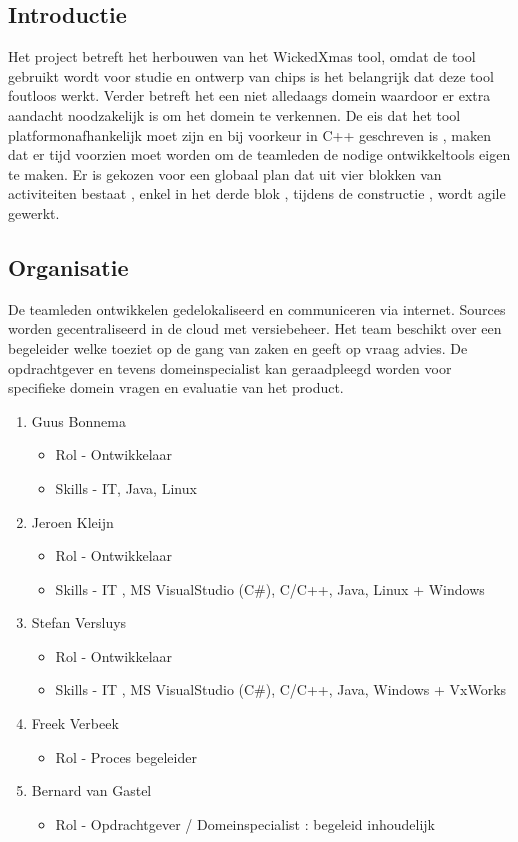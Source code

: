
\subsection{Introductie}
Het project betreft het herbouwen van het WickedXmas tool, omdat de tool gebruikt wordt voor studie
en ontwerp van chips is het belangrijk dat deze tool foutloos werkt. Verder betreft het een niet
alledaags domein waardoor er extra aandacht noodzakelijk is om het domein te verkennen. De eis dat
het tool platformonafhankelijk moet zijn en bij voorkeur in C++ geschreven is , maken dat er tijd
voorzien moet worden om de teamleden de nodige ontwikkeltools eigen te maken.
Er is gekozen voor een globaal plan dat uit vier blokken van activiteiten bestaat , enkel in het
derde blok , tijdens de constructie , wordt agile gewerkt.

\subsection{Organisatie}
 De teamleden ontwikkelen gedelokaliseerd en communiceren via internet. Sources worden gecentraliseerd
 in de cloud met versiebeheer. Het team beschikt over een begeleider welke toeziet op de gang van zaken
 en geeft op vraag advies. De opdrachtgever en tevens domeinspecialist kan geraadpleegd worden voor
 specifieke domein vragen en evaluatie van het product.
 \begin{enumerate}
 	\item Guus Bonnema
 	\begin{itemize}
		\item Rol - Ontwikkelaar
		\item Skills - IT, Java, Linux
	\end{itemize}
 	\item Jeroen Kleijn
 	\begin{itemize}
		\item Rol - Ontwikkelaar
		\item Skills - IT , MS VisualStudio (C\#), C/C++, Java, Linux + Windows
	\end{itemize}
 	\item Stefan Versluys
 	\begin{itemize}
		\item Rol - Ontwikkelaar
		\item Skills - IT , MS VisualStudio (C\#), C/C++, Java, Windows + VxWorks
	\end{itemize}
	\item Freek Verbeek
	\begin{itemize}
		\item Rol - Proces begeleider
	\end{itemize}
	\item Bernard van Gastel
	\begin{itemize}
		\item Rol - Opdrachtgever / Domeinspecialist : begeleid inhoudelijk
	\end{itemize}

 \end{enumerate}

